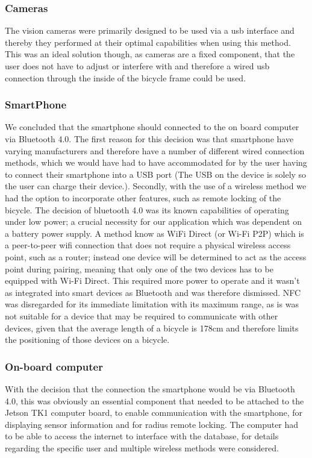 \documentclass[a4paper]{report}
\begin{document}
{\subsubsection{Cameras}
The vision cameras were primarily designed to be used via a usb interface and thereby they performed at their optimal capabilities when using this method. This was an ideal solution though, as cameras are a fixed component, that the user does not have to adjust or interfere with and therefore a wired usb connection through the inside of the bicycle frame could be used. 

\subsubsection{SmartPhone}We concluded that the smartphone should connected to the on board computer via Bluetooth 4.0. The first reason for this decision was that smartphone have varying manufacturers and therefore have a number of different wired connection methods, which we would have had to have accommodated for by the user having to connect their smartphone into a USB port (The USB on the device is solely so the user can charge their device.). Secondly, with the use of a wireless method we had the option to incorporate other features, such as remote locking of the bicycle. The decision of bluetooth 4.0 was its known capabilities of operating under low power; a crucial necessity for our application which was dependent on a battery power supply. A method know as WiFi Direct (or Wi-Fi P2P) which is a peer-to-peer wifi connection that does not require a physical wireless access point, such as a router; instead one device will be determined to act as the access point during pairing, meaning that only one of the two devices has to be equipped with Wi-Fi Direct.  This required more power to operate and it wasn't as integrated into smart devices as Bluetooth and was therefore dismissed. NFC was disregarded for its immediate limitation with its maximum range, as is was not suitable for a device that may be required to communicate with other devices, given that the average length of a bicycle is 178cm and therefore limits the positioning of those devices on a bicycle. 

\subsubsection{On-board computer}With the decision that the connection the smartphone would be via Bluetooth 4.0, this was obviously an essential component that needed to be attached to the Jetson TK1 computer board, to enable communication with the smartphone, for displaying sensor information and for radius remote locking. The computer had to be able to access the internet to interface with the database, for details regarding the specific user and multiple wireless methods were considered. 

}
\end{document}
